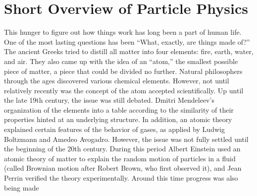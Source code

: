 \section{Short Overview of Particle Physics}
This hunger to figure out how things work has long 
been a part of human life.  
One of the most lasting questions has been 
``What, exactly, are things made of?'' 
The ancient Greeks tried to distill all matter into %
four elements: fire, earth, water, and air.  %
They also came up with the idea of an ``atom,'' 
the smallest possible piece of matter, 
a piece that could be divided no further.  
Natural philosophers through the ages 
discovered various chemical elements.  
However, not until relatively recently was 
the concept of the atom accepted scientifically. %
Up until the late 19th century, 
the issue was still debated.  
Dmitri Mendeleev's organization of the elements 
into a table according to the similarity of their properties 
hinted at an underlying structure.  
In addition, an atomic theory explained certain 
features of the behavior of gases, 
as applied by Ludwig Boltzmann and 
Amedeo Avogadro.  
However, the issue was not fully settled until 
the beginning of the 20th century.  
During this period 
Albert Einstein used an atomic theory of matter 
to explain the random motion of particles in a fluid %
(called Brownian motion after Robert Brown, who first observed it), 
and Jean Perrin verified the theory experimentally.  
Around this time progress was also being made 
